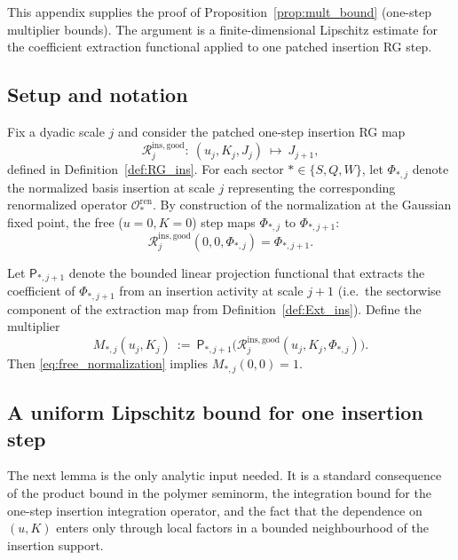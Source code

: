 
\label{app:multiplier_bounds}

This appendix supplies the proof of Proposition~\ref{prop:mult_bound} (one-step multiplier bounds).
The argument is a finite-dimensional Lipschitz estimate for the coefficient extraction functional applied to one patched insertion RG step.

\subsection*{Setup and notation}

Fix a dyadic scale $j$ and consider the patched one-step insertion RG map
\[
\mathcal R^{\mathrm{ins,good}}_j:\ (u_j,K_j,J_j)\ \longmapsto\ J_{j+1},
\]
defined in Definition~\ref{def:RG_ins}.
For each sector $*\in\{S,Q,W\}$, let $\Phi_{*,j}$ denote the normalized basis insertion at scale $j$ representing the corresponding renormalized operator $\mathcal O_*^{\mathrm{ren}}$.
By construction of the normalization at the Gaussian fixed point, the free ($u=0,K=0$) step maps $\Phi_{*,j}$ to $\Phi_{*,j+1}$:
\begin{equation}\label{eq:free_normalization}
\mathcal R^{\mathrm{ins,good}}_j(0,0,\Phi_{*,j})=\Phi_{*,j+1}.
\end{equation}

Let $\mathsf{P}_{*,j+1}$ denote the bounded linear projection functional that extracts the coefficient of $\Phi_{*,j+1}$ from an insertion activity at scale $j+1$
(i.e.\ the sectorwise component of the extraction map from Definition~\ref{def:Ext_ins}).
Define the multiplier
\begin{equation}\label{eq:def_M}
M_{*,j}(u_j,K_j)\ :=\ \mathsf{P}_{*,j+1}\Big(\mathcal R^{\mathrm{ins,good}}_j(u_j,K_j,\Phi_{*,j})\Big).
\end{equation}
Then \eqref{eq:free_normalization} implies $M_{*,j}(0,0)=1$.

\subsection*{A uniform Lipschitz bound for one insertion step}

The next lemma is the only analytic input needed.
It is a standard consequence of the product bound in the polymer seminorm, the integration bound for the one-step insertion integration operator,
and the fact that the dependence on $(u,K)$ enters only through local factors in a bounded neighbourhood of the insertion support.

